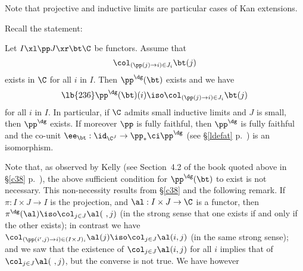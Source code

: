 \documentclass[12pt]{article}
\theoremstyle{remark}
\theoremstyle{definition}
\begin{document}



Note that projective and inductive limits are particular cases of Kan extensions.

Recall the statement: 

\begin{thm}[Theorem 2.3.3 (i) p.~52]
Let $I\xl\pp J\xr\bt\C$ be functors. Assume that 
$$
\col_{(\pp(j)\to i)\in J_i}\bt(j)
$$ 
exists in $\C$ for all $i$ in $I$. Then $\pp^\dg(\bt)$ exists and we have 
\begin{equation}\lb{236}
\pp^\dg(\bt)(i)\iso\col_{(\pp(j)\to i)\in J_i}\bt(j)
\end{equation} 
for all $i$ in $I$. In particular, if $\C$ admits small inductive limits and $J$ is small, then $\pp^\dg$ exists. If moreover $\pp$ is fully faithful, then $\pp^\dg$ is fully faithful and the co-unit $\ee_\bt:\id_{\C^J}\to\pp_*\ci\pp^\dg$ (see \S\ref{ldefat} p.~) is an isomorphism.
\end{thm}

Note that, as observed by Kelly (see Section~4.2 of the book quoted above in \S\ref{c38} p.~), the above sufficient condition for $\pp^\dg(\bt)$ to exist is not necessary. This non-necessity results from \S\ref{c38} and the following remark. If $\pi:I\times J\to I$ is the projection, and $\al:I\times J\to \C$ is a functor, then $\pi^\dg(\al)\iso\col_{j\in J}\al(\ ,j)$ (in the strong sense that one exists if and only if the other exists); in contrast we have $\col_{(\pp(i',j)\to i)\in(I\times J)_i}\al(j)\iso\col_{j\in J}\al(i,j)$ (in the same strong sense); and we saw that the existence of $\col_{j\in J}\al(i,j)$ for all $i$ implies that of $\col_{j\in J}\al(\ ,j)$, but the converse is not true. We have however 
\end{document}
